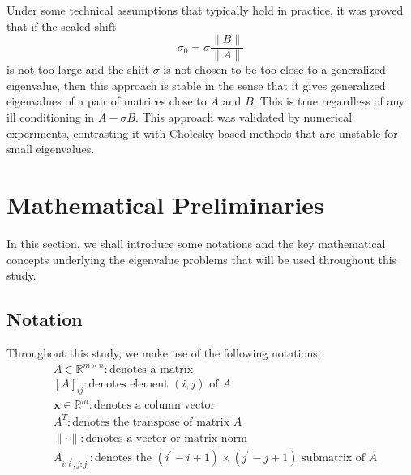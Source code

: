 Under some technical assumptions that typically hold in practice, it was proved that if the scaled shift
\begin{equation}
  \label{eq:ScaledShift}
  \sigma_0 = \sigma \frac{\|B\|}{\|A\|}
\end{equation}
is not too large and the shift $\sigma$ is not chosen to be too close to a generalized eigenvalue, then this approach is stable in the sense that it gives generalized eigenvalues of a pair of matrices close to $A$ and $B$.  This is true regardless of any ill conditioning in $A-\sigma B$.  This approach was validated by numerical experiments, contrasting it with Cholesky-based methods that are unstable for small eigenvalues.

\section{Mathematical Preliminaries}\label{sec:MathPrelim}
In this section, we shall introduce some notations and the key mathematical concepts underlying the eigenvalue problems that will be used throughout this study.
\subsection{Notation}\label{sec:Notation}
Throughout this study, we make use of the following notations:
\begin{align*}\nonumber
	&A \in \mathbb{R}^{m\times n}: \text{denotes a matrix}\\
	&[A]_{ij}: \text{denotes element $(i, j)$ of $A$}\\
	&\mathbf{x} \in \mathbb{R}^{m}: \text{denotes a column vector}\\
	&A^{T}: \text{denotes the transpose of matrix $A$}\\
	&\| \cdot \|: \text{denotes a vector or matrix norm }\\
	&A_{i:i^\prime, j:j^\prime}: \text{denotes the $(i^\prime - i + 1) \times (j^\prime - j + 1)$ submatrix of $A$}
\end{align*}

